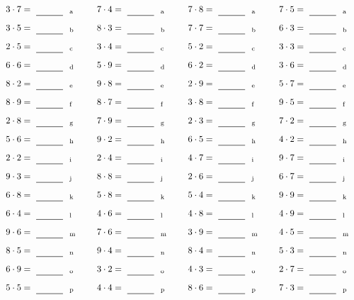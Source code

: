 \documentclass
[
  draft    = true,
  fontsize = 11pt,
  parskip  = half-
]
{scrartcl}
\begin{document}
\par\vfill\par
\begin{align*}
    \pline{3\cdot7}&=\rline{a}
  & \pline{7\cdot4}&=\rline{a}
  & \pline{7\cdot8}&=\rline{a}
  & \pline{7\cdot5}&=\rline{a} \\[1ex]
    \pline{3\cdot5}&=\rline{b}
  & \pline{8\cdot3}&=\rline{b}
  & \pline{7\cdot7}&=\rline{b}
  & \pline{6\cdot3}&=\rline{b} \\[1ex]
    \pline{2\cdot5}&=\rline{c}
  & \pline{3\cdot4}&=\rline{c}
  & \pline{5\cdot2}&=\rline{c}
  & \pline{3\cdot3}&=\rline{c} \\[1ex]
    \pline{6\cdot6}&=\rline{d}
  & \pline{5\cdot9}&=\rline{d}
  & \pline{6\cdot2}&=\rline{d}
  & \pline{3\cdot6}&=\rline{d} \\[1ex]
    \pline{8\cdot2}&=\rline{e}
  & \pline{9\cdot8}&=\rline{e}
  & \pline{2\cdot9}&=\rline{e}
  & \pline{5\cdot7}&=\rline{e} \\[1ex]
    \pline{8\cdot9}&=\rline{f}
  & \pline{8\cdot7}&=\rline{f}
  & \pline{3\cdot8}&=\rline{f}
  & \pline{9\cdot5}&=\rline{f} \\[1ex]
    \pline{2\cdot8}&=\rline{g}
  & \pline{7\cdot9}&=\rline{g}
  & \pline{2\cdot3}&=\rline{g}
  & \pline{7\cdot2}&=\rline{g} \\[1ex]
    \pline{5\cdot6}&=\rline{h}
  & \pline{9\cdot2}&=\rline{h}
  & \pline{6\cdot5}&=\rline{h}
  & \pline{4\cdot2}&=\rline{h} \\[1ex]
    \pline{2\cdot2}&=\rline{i}
  & \pline{2\cdot4}&=\rline{i}
  & \pline{4\cdot7}&=\rline{i}
  & \pline{9\cdot7}&=\rline{i} \\[1ex]
    \pline{9\cdot3}&=\rline{j}
  & \pline{8\cdot8}&=\rline{j}
  & \pline{2\cdot6}&=\rline{j}
  & \pline{6\cdot7}&=\rline{j} \\[1ex]
    \pline{6\cdot8}&=\rline{k}
  & \pline{5\cdot8}&=\rline{k}
  & \pline{5\cdot4}&=\rline{k}
  & \pline{9\cdot9}&=\rline{k} \\[1ex]
    \pline{6\cdot4}&=\rline{l}
  & \pline{4\cdot6}&=\rline{l}
  & \pline{4\cdot8}&=\rline{l}
  & \pline{4\cdot9}&=\rline{l} \\[1ex]
    \pline{9\cdot6}&=\rline{m}
  & \pline{7\cdot6}&=\rline{m}
  & \pline{3\cdot9}&=\rline{m}
  & \pline{4\cdot5}&=\rline{m} \\[1ex]
    \pline{8\cdot5}&=\rline{n}
  & \pline{9\cdot4}&=\rline{n}
  & \pline{8\cdot4}&=\rline{n}
  & \pline{5\cdot3}&=\rline{n} \\[1ex]
    \pline{6\cdot9}&=\rline{o}
  & \pline{3\cdot2}&=\rline{o}
  & \pline{4\cdot3}&=\rline{o}
  & \pline{2\cdot7}&=\rline{o} \\[1ex]
    \pline{5\cdot5}&=\rline{p}
  & \pline{4\cdot4}&=\rline{p}
  & \pline{8\cdot6}&=\rline{p}
  & \pline{7\cdot3}&=\rline{p}
\end{align*}
\end{document}

